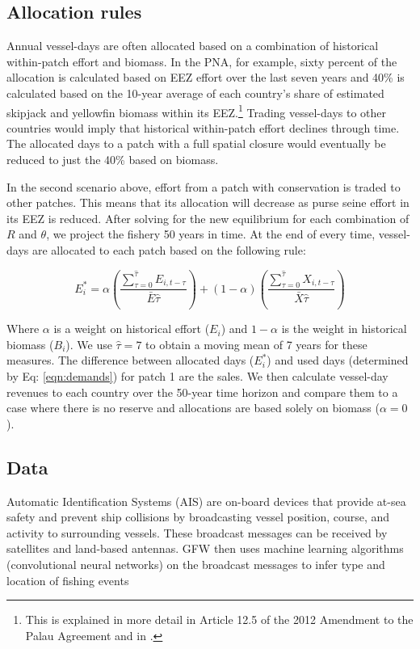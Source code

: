 \documentclass[12pt]{article}
\begin{document}
\subsection{Allocation rules}

Annual vessel-days are often allocated based on a combination of historical within-patch effort and biomass. In the PNA, for example, sixty percent of the allocation is calculated based on EEZ effort over the last seven years and 40\% is calculated based on the 10-year average of each country’s share of estimated skipjack and yellowfin biomass within its EEZ.\footnote{This is explained in more detail in Article 12.5 of the 2012 Amendment to the Palau Agreement and in \cite{Hagrannsoknir2014}.} Trading vessel-days to other countries would imply that historical within-patch effort declines through time. The allocated days to a patch with a full spatial closure would eventually be reduced to just the 40\% based on biomass.

In the second scenario above, effort from a patch with conservation is traded to other patches. This means that its allocation will decrease as purse seine effort in its EEZ is reduced. After solving for the new equilibrium for each combination of $R$ and $\theta$, we project the fishery 50 years in time. At the end of every time, vessel-days are allocated to each patch based on the following rule:

$$
E_i^* = \alpha \left(\frac{\sum_{\tau = 0}^{\hat{\tau}}E_{i,t-\tau}}{\bar{E}\hat{\tau}} \right) +
(1 - \alpha) \left(\frac{\sum_{\tau = 0}^{\hat{\tau}}X_{i,t-\tau}}{\bar{X}\hat{\tau}} \right)
$$

Where  $\alpha$ is a weight on historical effort ($E_i$) and $1-\alpha$ is the weight in historical biomass ($B_i$). We use $\hat{\tau}= 7$ to obtain a moving mean of 7 years for these measures. The difference between allocated days ($E_i^*$) and used days (determined by Eq: \ref{eqn:demands}) for patch 1 are the sales. We then calculate vessel-day revenues to each country over the 50-year time horizon and compare them to a case where there is no reserve and allocations are based solely on biomass ($\alpha = 0$).

\subsection{Data}

Automatic Identification Systems (AIS) are on-board devices that provide at-sea safety and prevent ship collisions by broadcasting vessel position, course, and activity to surrounding vessels. These broadcast messages can be received by satellites and land-based antennas. GFW then uses machine learning algorithms (convolutional neural networks) on the broadcast messages to infer type and location of fishing events \cite{kroodsma_2018}
\end{document}
